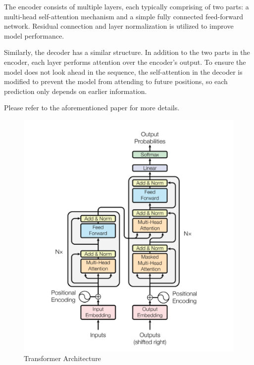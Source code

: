 \documentclass[licencjacka,en]{pracamgr}
\begin{document}
The encoder consists of multiple layers, each typically comprising of two parts: a multi-head self-attention mechanism and a simple fully connected feed-forward network. Residual connection and layer normalization is utilized to improve model performance. 

Similarly, the decoder has a similar structure. In addition to the two parts in the encoder, each layer performs attention over the encoder’s output. To ensure the model does not look ahead in the sequence, the self-attention in the decoder is modified to prevent the model from attending to future positions, so each prediction only depends on earlier information.

Please refer to the aforementioned paper for more details.

\begin{figure}
    \centering
    \includegraphics[width=0.5\linewidth]{bachelor_images/transformer_arch.png}
    \caption{Transformer Architecture \cite{attention}}
    \label{fig:transformers_fig}
\end{figure}
\end{document}
